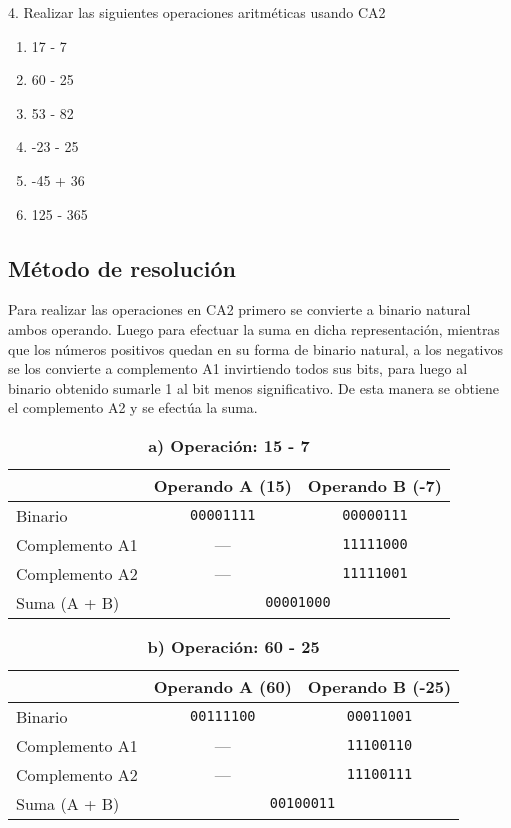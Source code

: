 \documentclass[a4paper,12pt]{article}
\begin{document}
	4. Realizar las siguientes operaciones aritméticas usando CA2
	\begin{enumerate}
		\renewcommand{\theenumi}{\alph{enumi}}	
		\item  17 - 7
		\item  60 - 25 
		\item  53 - 82
		\item  -23 - 25
		\item  -45 + 36
		\item  125 - 365
	\end{enumerate}
	
	\subsection*{Método de resolución}
	Para realizar las operaciones en CA2 primero se convierte a binario natural ambos operando. Luego para efectuar la suma en dicha representación, mientras que los números positivos quedan en su forma de binario natural, a los negativos se los convierte a complemento A1 invirtiendo todos sus bits, para luego al binario obtenido sumarle 1 al bit menos significativo. De esta manera se obtiene el complemento A2 y se efectúa la suma.\\
	
	\begin{table}[H]
		\centering
		\caption*{\textbf{a) Operación: 15 - 7}}
		\begin{tabular}{|l|c|c|}
			\hline
			\textbf{}       & \textbf{Operando A (15)} & \textbf{Operando B (-7)} \\
			\hline
			Binario         & \texttt{00001111}        & \texttt{00000111} \\
			Complemento A1  & ---                      & \texttt{11111000} \\
			Complemento A2  & ---                      & \texttt{11111001} \\
			\hline
			Suma (A + B)    & \multicolumn{2}{c|}{\texttt{00001000}} \\
			\hline
		\end{tabular}
	\end{table}
	
	\begin{table}[H]
		\centering
		\caption*{\textbf{b) Operación: 60 - 25}}
		\begin{tabular}{|l|c|c|}
			\hline
			\textbf{}       & \textbf{Operando A (60)} & \textbf{Operando B (-25)} \\
			\hline
			Binario         & \texttt{00111100}        & \texttt{00011001} \\
			Complemento A1  & ---                      & \texttt{11100110} \\
			Complemento A2  & ---                      & \texttt{11100111} \\
			\hline
			Suma (A + B)    & \multicolumn{2}{c|}{\texttt{00100011}} \\
			\hline
		\end{tabular}
	\end{table}
	
\end{document}
